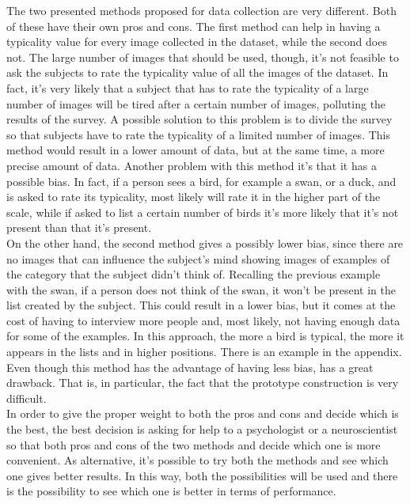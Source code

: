 \documentclass[conference]{IEEEtran}
\begin{document}
			The two presented methods proposed for data collection are very different. Both of these have their own pros and cons. The first method can help in having a typicality value for every image collected in the dataset, 
			while the second does not. The large number of images that should be used, though, it's not feasible to ask the subjects to rate the typicality value of all the images of the dataset. In fact, it's very likely 
			that a subject that has to rate the typicality of a large number of images will be tired after a certain number of images, polluting the results of the survey. A possible solution to this problem is to 
			divide the survey so that subjects have to rate the typicality of a limited number of images. This method would result in a lower amount of data, but at the same time, a more precise amount of data. Another 
			problem with this method it's that it has a possible bias. In fact, if a person sees a bird, for example a swan, or a duck, and is asked to rate its typicality, most likely will rate it in the higher part 
			of the scale, while if asked to list a certain number of birds it's more likely that it's not present than that it's present.\\
			On the other hand, the second method gives a possibly lower bias, since there are no images that can influence the subject's mind showing images of examples of the category that the subject didn't think of. 
			Recalling the previous example with the swan, if a person does not think of the swan, it won't be present in the list created by the subject. This could result in a lower bias, but it comes at the cost 
			of having to interview more people and, most likely, not having enough data for some of the examples. In this approach, the more a bird is typical, the more it appears in the lists and in higher positions. 
			There is an example in the appendix. Even though this method has the advantage of having less bias, has a  great drawback. That is, in particular, the fact that the prototype construction is very difficult.\\
			In order to give the proper weight to both the pros and cons and decide which is the best, the best decision is asking for help to a psychologist or a neuroscientist so that both pros and cons of the two 
			methods and decide which one is more convenient.
			As alternative, it's possible to try both the methods and see which one gives better results. In this way, both the possibilities will be used and there is the possibility to see which one is better in 
			terms of performance. 
			
\end{document}
